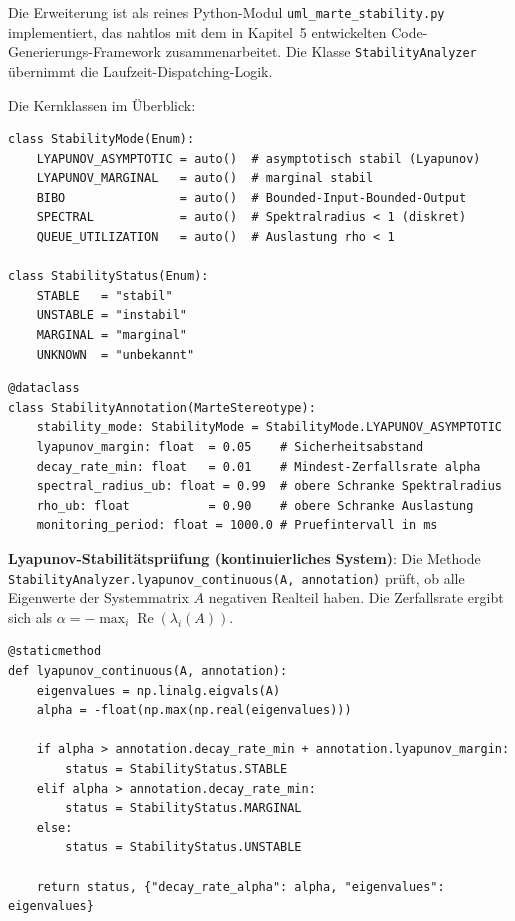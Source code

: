 ﻿\documentclass[a4paper,12pt]{report}
\theoremstyle{definition}
\begin{document}
Die Erweiterung ist als reines Python-Modul
\texttt{uml\_marte\_stability.py} implementiert, das nahtlos mit dem in
Kapitel~5 entwickelten Code-Generierungs-Framework zusammenarbeitet. Die
Klasse \texttt{StabilityAnalyzer} übernimmt die Laufzeit-Dispatching-Logik.

Die Kernklassen im Überblick:
\begin{lstlisting}[style=python,
	caption={Enum-Typen für Stabilitätsmodi und -status},
	label={lst:stability-enums}]
class StabilityMode(Enum):
	LYAPUNOV_ASYMPTOTIC = auto()  # asymptotisch stabil (Lyapunov)
	LYAPUNOV_MARGINAL   = auto()  # marginal stabil
	BIBO                = auto()  # Bounded-Input-Bounded-Output
	SPECTRAL            = auto()  # Spektralradius < 1 (diskret)
	QUEUE_UTILIZATION   = auto()  # Auslastung rho < 1
	
class StabilityStatus(Enum):
	STABLE   = "stabil"
	UNSTABLE = "instabil"
	MARGINAL = "marginal"
	UNKNOWN  = "unbekannt"
\end{lstlisting}

\begin{lstlisting}[style=python,
	caption={Stereotyp \texttt{<<StabilityAnnotation>>} als Python-Dataclass},
	label={lst:stability-annotation-class}]
@dataclass
class StabilityAnnotation(MarteStereotype):
	stability_mode: StabilityMode = StabilityMode.LYAPUNOV_ASYMPTOTIC
	lyapunov_margin: float  = 0.05    # Sicherheitsabstand
	decay_rate_min: float   = 0.01    # Mindest-Zerfallsrate alpha
	spectral_radius_ub: float = 0.99  # obere Schranke Spektralradius
	rho_ub: float           = 0.90    # obere Schranke Auslastung
	monitoring_period: float = 1000.0 # Pruefintervall in ms
\end{lstlisting}

\textbf{Lyapunov-Stabilitätsprüfung (kontinuierliches System)}:
Die Methode \texttt{Stabili\newline tyAnalyzer.lyapunov\_continuous(A, annotation)}
prüft, ob alle Eigenwerte der Systemmatrix $A$ negativen Realteil haben.
Die Zerfallsrate ergibt sich als
$\alpha = -\max_i \operatorname{Re}(\lambda_i(A))$.

\begin{lstlisting}[style=python,
	caption={Lyapunov-Stabilitätsprüfung via Eigenwertanalyse},
	label={lst:lyapunov}]
@staticmethod
def lyapunov_continuous(A, annotation):
	eigenvalues = np.linalg.eigvals(A)
	alpha = -float(np.max(np.real(eigenvalues)))
	
	if alpha > annotation.decay_rate_min + annotation.lyapunov_margin:
		status = StabilityStatus.STABLE
	elif alpha > annotation.decay_rate_min:
		status = StabilityStatus.MARGINAL
	else:
		status = StabilityStatus.UNSTABLE
	
	return status, {"decay_rate_alpha": alpha, "eigenvalues": eigenvalues}
\end{lstlisting}
\end{document}
